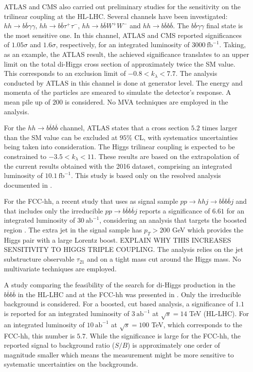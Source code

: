 ATLAS and CMS also carried out preliminary studies for the sensitivity on the trilinear coupling at the HL-LHC. Several channels have been investigated: $hh\rightarrow  b\overline{b}\gamma\gamma$, $hh\rightarrow b\overline{b} \tau^+ \tau^-$, $hh\rightarrow b\overline{b} W^+ W^-$ and $hh\rightarrow  b\overline{b}b\overline{b}$. The $b\overline{b}\gamma\gamma$ final state is the most sensitive one. In this channel, ATLAS and CMS reported significances of $1.05\sigma$ and $1.6\sigma$, respectively, for an integrated luminosity of $3000~\text{fb}^{-1}$. Taking, as an example, the ATLAS result, the achieved significance translates to an upper limit on the total di-Higgs cross section of approximately twice the SM value. This corresponds to an exclusion limit of $-0.8<k_{\lambda}<7.7$. The analysis conducted by ATLAS in this channel is done at generator level. The energy and momenta of the particles are smeared to simulate the detector's response. A mean pile up of $200$ is considered. No MVA techniques are employed in the analysis. 

For the $hh\rightarrow  b\overline{b}b\overline{b}$ channel, ATLAS states that a cross section $5.2$ times larger than the SM value can be excluded at $95\%$ CL, with systematics uncertainties being taken into consideration. The Higgs trilinear coupling is expected to be constrained to $-3.5<k_{\lambda}<11$. These results are based on the extrapolation of the current results obtained with the 2016 dataset, comprising an integrated luminosity of $10.1~\text{fb}^{-1}$. This study is based only on the resolved analysis documented in \cite{hh2bbbbATLAS}.

For the FCC-hh, a recent study that uses as signal sample $pp\rightarrow hhj\rightarrow b\overline{b}b\overline{b}j$ and that includes only the irreducible $pp\rightarrow b\overline{b}b\overline{b}j$ reports a significance of $6.61$ for an integrated luminosity of $30~\text{ab}^{-1}$, considering an analysis that targets the boosted region \cite{hh+jet_100TeV}. The extra jet in the signal sample has $p_T>200$ GeV which provides the Higgs pair with a large Lorentz boost. EXPLAIN WHY THIS INCREASES SENSITIVITY TO HIGGS TRIPLE COUPLING. The analysis relies on the jet substructure observable $\tau_{21}$ and on a tight mass cut around the Higgs mass. No multivariate techniques are employed. 

A study comparing the feasibility of the search for di-Higgs production in the $b\overline{b}b\overline{b}$ in the HL-LHC and at the FCC-hh was presented in \cite{hhFeasibility1_100TeV}. Only the irreducible background is considered. For a boosted, cut based analysis, a significance of $1.1$ is reported for an integrated luminosity of $3~\text{ab}^{-1}$ at $\sqrt{s}=14$ TeV (HL-LHC). For an integrated luminosity of $10~\text{ab}^{-1}$ at $\sqrt{s}=100$ TeV, which corresponds to the FCC-hh, this number is $5.7$. While the significance is large for the FCC-hh, the reported signal to background ratio ($S/B$) is approximately one order of magnitude smaller which means the measurement might be more sensitive to systematic uncertainties on the backgrounds. 

